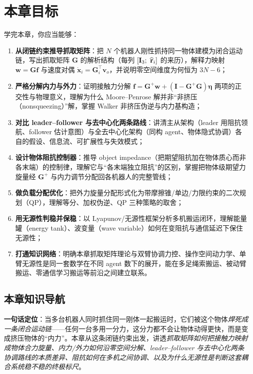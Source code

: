 \section*{本章目标}
学完本章，你应当能够：
\begin{enumerate}
  \item \textbf{从闭链约束推导抓取矩阵}：把 $N$ 个机器人刚性抓持同一物体建模为闭合运动链，写出抓取矩阵 $\mathbf{G}$ 的解析结构（每列 $[\mathbf{I}_3;\ \skewm{\mathbf{r}}_i]$ 的来历），解释力映射 $\mathbf{w}=\mathbf{G}\mathbf{f}$ 与速度对偶 $\dot{\mathbf{x}}_i=\mathbf{G}_i^\top\mathbf{v}_o$，并说明零空间维度为何恒为 $3N-6$；
  \item \textbf{严格分解内力与外力}：证明接触力分解 $\mathbf{f}=\mathbf{G}^{+}\mathbf{w}+(\mathbf{I}-\mathbf{G}^{+}\mathbf{G})\boldsymbol{\eta}$ 两项的正交性与物理意义，理解为什么 Moore--Penrose 解并非“非挤压（nonsqueezing）”解，掌握 Walker 非挤压伪逆与内力基构造；
  \item \textbf{对比 leader--follower 与去中心化两条路线}：讲清主从架构（leader 用阻抗领航、follower 估计意图）与全去中心化架构（同构 agent、物体隐式协调）各自的假设、信息流、可扩展性与失效模式；
  \item \textbf{设计物体阻抗控制器}：推导 object impedance（把期望阻抗加在物体质心而非各末端）的控制律，理解它与“各末端独立阻抗”的区别，掌握把物体级期望力旋量经 $\mathbf{G}^{+}$ 与内力调节分配回各机器人的完整管线；
  \item \textbf{做负载分配优化}：把外力旋量分配形式化为带摩擦锥/单边/力限约束的二次规划（QP），理解等分、加权伪逆、QP 三种策略的取舍；
  \item \textbf{用无源性判稳并保稳}：以 Lyapunov/无源性框架分析多机搬运闭环，理解能量罐（energy tank）、波变量（wave variable）如何在变阻抗与通信延迟下保住无源性；
  \item \textbf{打通知识网络}：明确本章抓取矩阵理论与双臂协调力控、操作空间动力学、单臂无源性是同一套数学在不同 agent 数下的展开，能在多足绳索搬运、被动臂搬运、零通信学习搬运等前沿之间建立联系。
\end{enumerate}

\subsection*{本章知识导航}
\textbf{一句话定位}：当多台机器人同时抓住同一刚体一起搬运时，它们被这个物体\emph{焊死成一条闭合运动链}——任何一台多用一分力，这分力都不会让物体动得更快，而是变成挤压物体的“内力”。本章从这条闭链约束出发，讲透\emph{抓取矩阵如何把接触力映射成物体合力旋量、内力/外力如何沿零空间分解、leader--follower 与去中心化两条协调路线的本质差异、阻抗如何在多机之间协调、以及为什么无源性是判断这套耦合系统稳不稳的终极标尺}。

